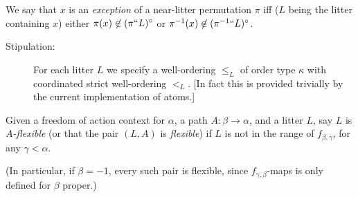 \begin{definition}
\label{def:perm-exception}
\leanok
{}
We say that $x$ is an {\em exception} of a near-litter permutation $\pi$ iff ($L$ being the litter containing $x$) either $\pi(x) \not\in (\pi``L)^\circ$ or $\pi^{-1}(x) \not\in ({\pi^{-1}}``L)^\circ$.
\end{definition}

\begin{description}
\item[Stipulation:]  For each litter $L$ we specify a well-ordering $\leq_L$ of order type $\kappa$ with coordinated strict well-ordering $<_L$.  [In fact this is provided trivially by the current implementation of atoms.]
\end{description}

\begin{definition}
  \label{def:flexible-old}
  Given a freedom of action context for $\alpha$, a path $A : \beta \to \alpha$, and a litter $L$, say $L$ is \emph{$A$-flexible} (or that the pair $(L,A)$ is \emph{flexible}) if $L$ is not in the range of $f_{\beta,\gamma}$, for any $\gamma < \alpha$.

  (In particular, if $\beta = -1$, every such pair is flexible, since $f_{\gamma,\beta}$-maps is only defined for $\beta$ proper.)
\end{definition}

